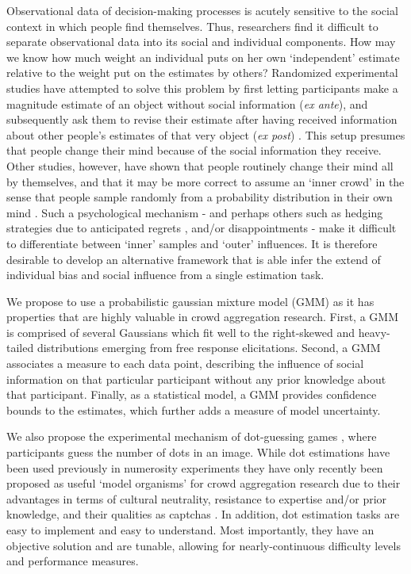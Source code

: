 \documentclass[9pt,a4paper,twocolumn,lineno]{article}
\begin{document}
Observational data of decision-making processes is acutely sensitive to the social context in which people find themselves. Thus, researchers find it difficult to separate observational data into its social and individual components. How may we know how much weight an individual puts on her own ‘independent’ estimate relative to the weight put on the estimates by others? Randomized experimental studies have attempted to solve this problem by first letting participants make a magnitude estimate of an object without social information (\textit{ex ante}), and subsequently ask them to revise their estimate after having received information about other people’s estimates of that very object (\textit{ex post}) \cite{becker2017network, jayles2017social, lorenz2011social, sniezek1995cueing, mavrodiev2013quantifying}. This setup %
presumes that people change their mind because of the social information they receive. Other studies, however, have shown that people routinely change their mind all by themselves, and that it may be more correct to assume an `inner crowd' in the sense that people sample randomly from a probability distribution in their own mind \cite{vul2008measuring, herzog2009wisdom, herzog2014harnessing}. Such a psychological mechanism - and perhaps others such as hedging strategies due to anticipated regrets \cite{bell1982regret}, and/or disappointments \cite{loomes1986disappointment} - make it difficult to differentiate between `inner' samples and `outer' influences. It is therefore desirable to develop an alternative framework that is able infer the extend of individual bias and social influence from a single estimation task.

We propose to use a probabilistic gaussian mixture model (GMM) as it has properties that are highly valuable in crowd aggregation research. First, a GMM is comprised of several Gaussians which fit well to the right-skewed and heavy-tailed distributions emerging from free response elicitations. Second, a GMM associates a measure to each data point, describing the influence of social information on that particular participant without any prior knowledge about that participant. Finally, as a statistical model, a GMM provides confidence bounds to the estimates, which further adds a measure of model uncertainty.

We also propose the experimental mechanism of dot-guessing games \cite{horton2010dot}, where participants guess the number of dots in an image. While dot estimations have been used previously in numerosity experiments \cite{minturn1951effect, indow1977scaling, krueger1982single} they have only recently been proposed as useful ‘model organisms’ for crowd aggregation research \cite{horton2010dot, ugander2015wisdom} due to their advantages in terms of cultural neutrality, resistance to expertise and/or prior knowledge, and their qualities as captchas \cite{von2008recaptcha}. In addition, dot estimation tasks are easy to implement and easy to understand. Most importantly, they have an objective solution and are tunable, allowing for nearly-continuous difficulty levels and performance measures.
\end{document}
